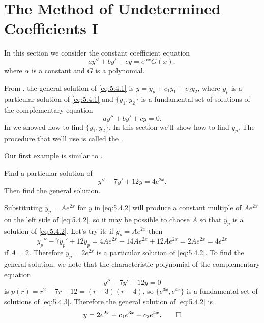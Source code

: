 \section{The Method of Undetermined Coefficients I}\label{sec:undetermined_coeffs_i}

In this section we consider the constant coefficient equation
\begin{equation} \label{eq:5.4.1}
ay''+by'+cy=e^{\alpha x}G(x),
\end{equation}
where $\alpha$ is a constant and $G$ is a polynomial.


From , the general solution of \eqref{eq:5.4.1}
is
$y=y_p+c_1y_1+c_2y_2$, where $y_p$ is a particular
solution
of
\eqref{eq:5.4.1} and $\{y_1,y_2\}$ is a fundamental set of
solutions of the complementary equation
\[
ay''+by'+cy=0.
\]
In  we showed how to find $\{y_1,y_2\}$. In this
section we'll show how to find $y_p$. The procedure that we'll use
is called the .

Our first example is similar to
.

\begin{example}\label{example:5.4.1}
Find a particular solution of
\begin{equation} \label{eq:5.4.2}
y''-7y'+12y=4e^{2x}.
\end{equation}
Then find the general solution.
\end{example}

\begin{solution}
Substituting $y_p=Ae^{2x}$ for $y$ in \eqref{eq:5.4.2} will produce a
constant multiple of $Ae^{2x}$ on the left side of \eqref{eq:5.4.2}, so it
may be possible to choose $A$ so that $y_p$ is a solution of
\eqref{eq:5.4.2}. Let's try it;   if $y_p=Ae^{2x}$ then
\[
y_p''-7y_p'+12y_p=4Ae^{2x}-14Ae^{2x}+12Ae^{2x}=2Ae^{2x}=4e^{2x}
\]
if $A=2$. Therefore $y_p=2e^{2x}$ is a particular solution of
\eqref{eq:5.4.2}. To find the general solution, we note that the
characteristic polynomial of the complementary equation
\begin{equation} \label{eq:5.4.3}
y''-7y'+12y=0
\end{equation}
is $p(r)=r^2-7r+12=(r-3)(r-4)$, so $\{e^{3x},e^{4x}\}$ is a
fundamental set of solutions of \eqref{eq:5.4.3}. Therefore the general
solution of \eqref{eq:5.4.2} is
\[
 y=2e^{2x}+c_1e^{3x}+c_2e^{4x}.\qedhere
\]
\end{solution}


